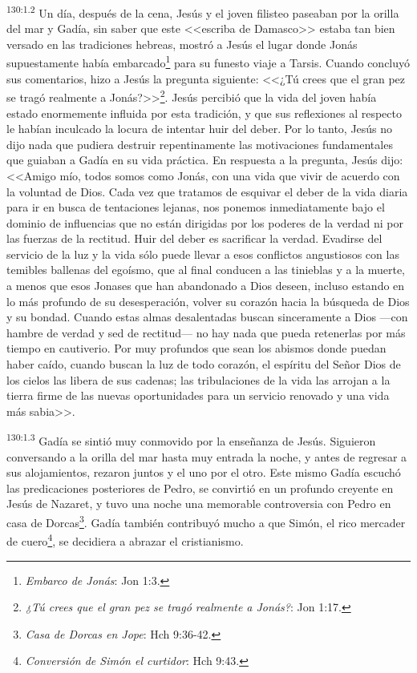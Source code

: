 \par 
\textsuperscript{130:1.2} Un día, después de la cena, Jesús y el joven filisteo paseaban por la orilla del mar y Gadía, sin saber que este <<escriba de Damasco>> estaba tan bien versado en las tradiciones hebreas, mostró a Jesús el lugar donde Jonás supuestamente había embarcado\footnote{\textit{Embarco de Jonás}: Jon 1:3.} para su funesto viaje a Tarsis. Cuando concluyó sus comentarios, hizo a Jesús la pregunta siguiente: <<¿Tú crees que el gran pez se tragó realmente a Jonás?>>\footnote{\textit{¿Tú crees que el gran pez se tragó realmente a Jonás?}: Jon 1:17.}. Jesús percibió que la vida del joven había estado enormemente influida por esta tradición, y que sus reflexiones al respecto le habían inculcado la locura de intentar huir del deber. Por lo tanto, Jesús no dijo nada que pudiera destruir repentinamente las motivaciones fundamentales que guiaban a Gadía en su vida práctica. En respuesta a la pregunta, Jesús dijo: <<Amigo mío, todos somos como Jonás, con una vida que vivir de acuerdo con la voluntad de Dios. Cada vez que tratamos de esquivar el deber de la vida diaria para ir en busca de tentaciones lejanas, nos ponemos inmediatamente bajo el dominio de influencias que no están dirigidas por los poderes de la verdad ni por las fuerzas de la rectitud. Huir del deber es sacrificar la verdad. Evadirse del servicio de la luz y la vida sólo puede llevar a esos conflictos angustiosos con las temibles ballenas del egoísmo, que al final conducen a las tinieblas y a la muerte, a menos que esos Jonases que han abandonado a Dios deseen, incluso estando en lo más profundo de su desesperación, volver su corazón hacia la búsqueda de Dios y su bondad. Cuando estas almas desalentadas buscan sinceramente a Dios ---con hambre de verdad y sed de rectitud--- no hay nada que pueda retenerlas por más tiempo en cautiverio. Por muy profundos que sean los abismos donde puedan haber caído, cuando buscan la luz de todo corazón, el espíritu del Señor Dios de los cielos las libera de sus cadenas; las tribulaciones de la vida las arrojan a la tierra firme de las nuevas oportunidades para un servicio renovado y una vida más sabia>>.

\par 
\textsuperscript{130:1.3} Gadía se sintió muy conmovido por la enseñanza de Jesús. Siguieron conversando a la orilla del mar hasta muy entrada la noche, y antes de regresar a sus alojamientos, rezaron juntos y el uno por el otro. Este mismo Gadía escuchó las predicaciones posteriores de Pedro, se convirtió en un profundo creyente en Jesús de Nazaret, y tuvo una noche una memorable controversia con Pedro en casa de Dorcas\footnote{\textit{Casa de Dorcas en Jope}: Hch 9:36-42.}. Gadía también contribuyó mucho a que Simón, el rico mercader de cuero\footnote{\textit{Conversión de Simón el curtidor}: Hch 9:43.}, se decidiera a abrazar el cristianismo.

